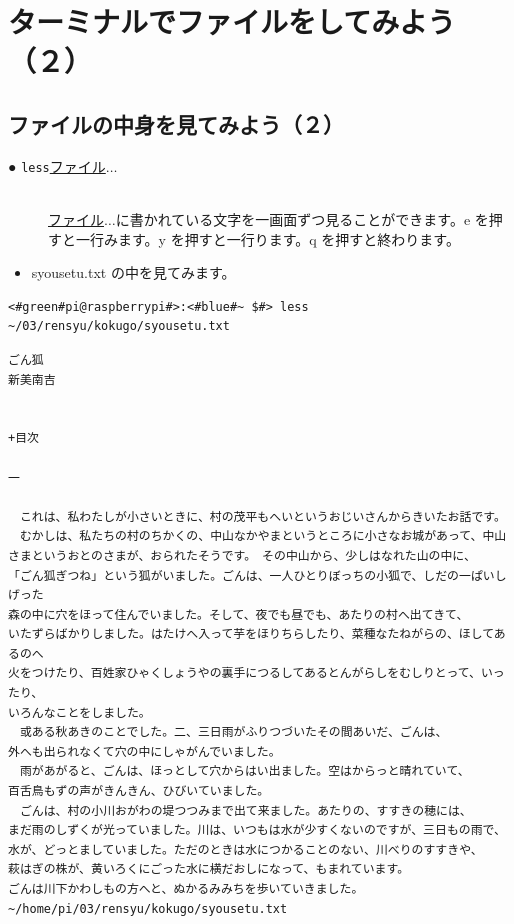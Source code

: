 \documentclass[text03.tex]{subfiles}
\begin{document}
\newpage
\section{ターミナルでファイルをしてみよう（２）}

\subsection{ファイルの中身を見てみよう（２）}
\begin{description}
\item[● \texttt{less}\textvisiblespace \underline{ファイル}$\ldots$]\mbox{}\\
\underline{ファイル}$\ldots$に書かれている文字を一画面ずつ見ることができます。e を押すと一行みます。y を押すと一行ります。q を押すと終わります。

\end{description}
\begin{itemize}
\item[<例>]syousetu.txt の中を見てみます。
\end{itemize}
\begin{lstlisting}[caption=lessの例, label=less]
<#green#pi@raspberrypi#>:<#blue#~ $#> less ~/03/rensyu/kokugo/syousetu.txt
\end{lstlisting}
\begin{lstlisting}[caption=lessの結果, label=less-result]
ごん狐
新美南吉


+目次

一

　これは、私わたしが小さいときに、村の茂平もへいというおじいさんからきいたお話です。
　むかしは、私たちの村のちかくの、中山なかやまというところに小さなお城があって、中山
さまというおとのさまが、おられたそうです。　その中山から、少しはなれた山の中に、
「ごん狐ぎつね」という狐がいました。ごんは、一人ひとりぼっちの小狐で、しだの一ぱいしげった
森の中に穴をほって住んでいました。そして、夜でも昼でも、あたりの村へ出てきて、
いたずらばかりしました。はたけへ入って芋をほりちらしたり、菜種なたねがらの、ほしてあるのへ
火をつけたり、百姓家ひゃくしょうやの裏手につるしてあるとんがらしをむしりとって、いったり、
いろんなことをしました。
　或ある秋あきのことでした。二、三日雨がふりつづいたその間あいだ、ごんは、
外へも出られなくて穴の中にしゃがんでいました。
　雨があがると、ごんは、ほっとして穴からはい出ました。空はからっと晴れていて、
百舌鳥もずの声がきんきん、ひびいていました。
　ごんは、村の小川おがわの堤つつみまで出て来ました。あたりの、すすきの穂には、
まだ雨のしずくが光っていました。川は、いつもは水が少すくないのですが、三日もの雨で、
水が、どっとましていました。ただのときは水につかることのない、川べりのすすきや、
萩はぎの株が、黄いろくにごった水に横だおしになって、もまれています。
ごんは川下かわしもの方へと、ぬかるみみちを歩いていきました。
~/home/pi/03/rensyu/kokugo/syousetu.txt
\end{lstlisting}
\end{document}
